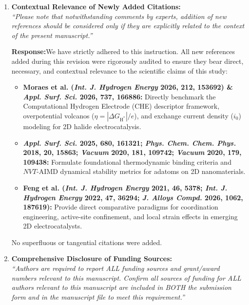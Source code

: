 \documentclass[11pt, sans, a4paper]{moderncv}
\newcommand{\response}{\vspace{0.4em}\noindent\textbf{\color{actionblue}Response:}\hspace{0.5em}}
\begin{document}
\begin{enumerate}[leftmargin=1.5em, itemsep=0.8em, label=\textbf{\arabic*.}]
  \item \textbf{Contextual Relevance of Newly Added Citations:}\\
    \textit{``Please note that notwithstanding comments by experts, addition of new references should be considered only if they are explicitly related to the context of the present manuscript.''}

    \response We have strictly adhered to this instruction. All new references added during this revision were rigorously audited to ensure they bear direct, necessary, and contextual relevance to the scientific claims of this study:
    \begin{itemize}[leftmargin=1.2em, itemsep=0.2em]
      \item \textbf{Moraes et al. (\textit{Int. J. Hydrogen Energy} 2026, 212, 153692) \& \textit{Appl. Surf. Sci.} 2026, 737, 166886:} Directly benchmark the Computational Hydrogen Electrode (CHE) descriptor framework, overpotential volcanos ($\eta = |\Delta G_{\mathrm{H}^*}|/e$), and exchange current density ($i_0$) modeling for 2D halide electrocatalysis.
      \item \textbf{\textit{Appl. Surf. Sci.} 2025, 680, 161321; \textit{Phys. Chem. Chem. Phys.} 2018, 20, 15863; \textit{Vacuum} 2020, 181, 109742; \textit{Vacuum} 2020, 179, 109438:} Formulate foundational thermodynamic binding criteria and $NVT$-AIMD dynamical stability metrics for adatoms on 2D nanomaterials.
      \item \textbf{Feng et al. (\textit{Int. J. Hydrogen Energy} 2021, 46, 5378; \textit{Int. J. Hydrogen Energy} 2022, 47, 36294; \textit{J. Alloys Compd.} 2026, 1062, 187619):} Provide direct comparative paradigms for coordination engineering, active-site confinement, and local strain effects in emerging 2D electrocatalysts.
    \end{itemize}
    No superfluous or tangential citations were added.

  \item \textbf{Comprehensive Disclosure of Funding Sources:}\\
    \textit{``Authors are required to report ALL funding sources and grant/award numbers relevant to this manuscript. Confirm all sources of funding for ALL authors relevant to this manuscript are included in BOTH the submission form and in the manuscript file to meet this requirement.''}


\end{enumerate}
\end{document}
